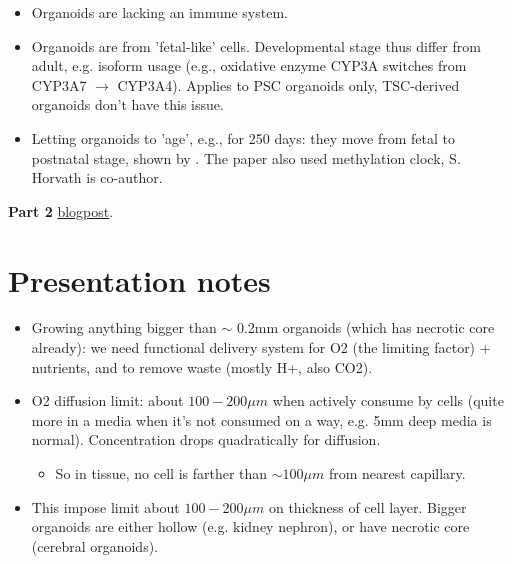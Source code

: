 \documentclass[11pt]{article}
\begin{document}
\begin{itemize}
\begin{itemize}
			\item Drug delivery normally happens via blood stream, so this aspect is missing in drug experiments on organoids.
		\end{itemize}
		\item Organoids are lacking an immune system.
		\item Organoids are from 'fetal-like' cells. Developmental stage thus differ from adult, e.g. isoform usage (e.g., oxidative enzyme CYP3A switches from CYP3A7 $\to$ CYP3A4). Applies to PSC organoids only, TSC-derived organoids don't have this issue.
		\item Letting organoids to 'age', e.g., for 250 days: they move from fetal to postnatal stage, shown by \cite{gordonLongtermMaturationHuman2021}. The paper also used methylation clock, S. Horvath is co-author.
	\end{itemize}

	\textbf{Part 2} \href{https://www.owlposting.com/p/where-have-organoids-actually-been}{blogpost}.
	
	\section*{Presentation notes}
	\begin{itemize}
		\item Growing anything bigger than $\sim$ 0.2mm organoids (which has necrotic core already): we need functional delivery system for O2 (the limiting factor) + nutrients, and to remove waste (mostly H+, also CO2).
		\item O2 diffusion limit: about $100-200 \mu m$ when actively consume by cells (quite more in a media when it's not consumed on a way, e.g. 5mm deep media is normal). Concentration drops quadratically for diffusion.
		\begin{itemize}
			\item So in tissue, no cell is farther than $\sim 100 \mu m$ from nearest capillary.		
		\end{itemize}
	\item This impose limit about $100-200 \mu m$ on thickness of cell layer. Bigger organoids are either hollow (e.g. kidney nephron), or have necrotic core (cerebral organoids).
	\end{itemize}

	
	
	

	
	
\end{document}
